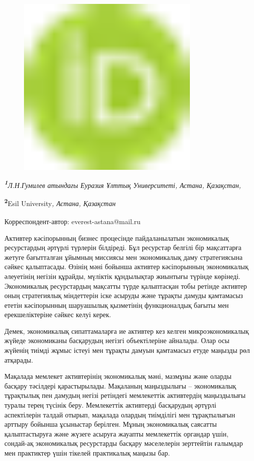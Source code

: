{\begin{figure}[H]
	\centering
	\includegraphics[width=0.8\textwidth]{media/ekon2/image1}
	\caption*{}
\end{figure}


\emph{{\bfseries \textsuperscript{1}}Л.Н.Гумилев атындағы Еуразия Ұлттық
Университеті, Астана, Қазақстан,}

{\bfseries \textsuperscript{2}}Esil University\emph{, Астана, Қазақстан}

{\bfseries \textsuperscript{\envelope }}Корреспондент-автор: everest-astana@mail.ru

Активтер кәсіпорынның бизнес процесінде пайдаланылатын экономикалық
ресурстардың әртүрлі түрлерін білдіреді. Бұл ресурстар белгілі бір
мақсаттарға жетуге бағытталған ұйымның миссиясы мен экономикалық даму
стратегиясына сәйкес қалыптасады. Өзінің мәні бойынша активтер
кәсіпорынның экономикалық әлеуетінің негізін құрайды, мүліктік
құндылықтар жиынтығы түрінде көрінеді. Экономикалық ресурстардың
мақсатты түрде қалыптасқан тобы ретінде активтер оның стратегиялық
міндеттерін іске асыруды және тұрақты дамуды қамтамасыз ететін
кәсіпорынның шаруашылық қызметінің функционалдық бағыты мен
ерекшеліктеріне сәйкес келуі керек.

Демек, экономикалық сипаттамаларға ие активтер кез келген
микроэкономикалық жүйеде экономиканы басқарудың негізгі объектілеріне
айналады. Олар осы жүйенің тиімді жұмыс істеуі мен тұрақты дамуын
қамтамасыз етуде маңызды рөл атқарады.

Мақалада мемлекет активтерінің экономикалық мәні, мазмұны және оларды
басқару тәсілдері қарастырылады. Мақаланың маңыздылығы -- экономикалық
тұрақтылық пен дамудың негізі ретіндегі мемлекеттік активтердің
маңыздылығы туралы терең түсінік беру. Мемлекеттік активтерді басқарудың
әртүрлі аспектілерін талдай отырып, мақалада олардың тиімділігі мен
тұрақтылығын арттыру бойынша ұсыныстар берілген. Мұның экономикалық
саясатты қалыптастыруға және жүзеге асыруға жауапты мемлекеттік органдар
үшін, сондай-ақ экономикалық ресурстарды басқару мәселелерін зерттейтін
ғалымдар мен практиктер үшін тікелей практикалық маңызы бар.

}

